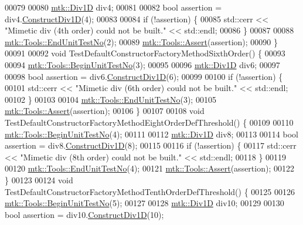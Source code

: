 \begin{DoxyCode}
00079 
00080   \hyperlink{classmtk_1_1Div1D}{mtk::Div1D} div4;
00081 
00082   \textcolor{keywordtype}{bool} assertion = div4.\hyperlink{classmtk_1_1Div1D_a52fcd1542f11e606e36bd188e48bfdf7}{ConstructDiv1D}(4);
00083 
00084   \textcolor{keywordflow}{if} (!assertion) \{
00085     std::cerr << \textcolor{stringliteral}{"Mimetic div (4th order) could not be built."} << std::endl;
00086   \}
00087 
00088   \hyperlink{classmtk_1_1Tools_aba67d9dc35c9c1c49430fcc9ea035e03}{mtk::Tools::EndUnitTestNo}(2);
00089   \hyperlink{classmtk_1_1Tools_ac6804df469c94ab6a796fb64f1e44a89}{mtk::Tools::Assert}(assertion);
00090 \}
00091 
00092 \textcolor{keywordtype}{void} TestDefaultConstructorFactoryMethodSixthOrder() \{
00093 
00094   \hyperlink{classmtk_1_1Tools_afc29ecaf337a13ed2e817d3890a5a441}{mtk::Tools::BeginUnitTestNo}(3);
00095 
00096   \hyperlink{classmtk_1_1Div1D}{mtk::Div1D} div6;
00097 
00098   \textcolor{keywordtype}{bool} assertion = div6.\hyperlink{classmtk_1_1Div1D_a52fcd1542f11e606e36bd188e48bfdf7}{ConstructDiv1D}(6);
00099 
00100   \textcolor{keywordflow}{if} (!assertion) \{
00101     std::cerr << \textcolor{stringliteral}{"Mimetic div (6th order) could not be built."} << std::endl;
00102   \}
00103 
00104   \hyperlink{classmtk_1_1Tools_aba67d9dc35c9c1c49430fcc9ea035e03}{mtk::Tools::EndUnitTestNo}(3);
00105   \hyperlink{classmtk_1_1Tools_ac6804df469c94ab6a796fb64f1e44a89}{mtk::Tools::Assert}(assertion);
00106 \}
00107 
00108 \textcolor{keywordtype}{void} TestDefaultConstructorFactoryMethodEightOrderDefThreshold() \{
00109 
00110   \hyperlink{classmtk_1_1Tools_afc29ecaf337a13ed2e817d3890a5a441}{mtk::Tools::BeginUnitTestNo}(4);
00111 
00112   \hyperlink{classmtk_1_1Div1D}{mtk::Div1D} div8;
00113 
00114   \textcolor{keywordtype}{bool} assertion = div8.\hyperlink{classmtk_1_1Div1D_a52fcd1542f11e606e36bd188e48bfdf7}{ConstructDiv1D}(8);
00115 
00116   \textcolor{keywordflow}{if} (!assertion) \{
00117     std::cerr << \textcolor{stringliteral}{"Mimetic div (8th order) could not be built."} << std::endl;
00118   \}
00119 
00120   \hyperlink{classmtk_1_1Tools_aba67d9dc35c9c1c49430fcc9ea035e03}{mtk::Tools::EndUnitTestNo}(4);
00121   \hyperlink{classmtk_1_1Tools_ac6804df469c94ab6a796fb64f1e44a89}{mtk::Tools::Assert}(assertion);
00122 \}
00123 
00124 \textcolor{keywordtype}{void} TestDefaultConstructorFactoryMethodTenthOrderDefThreshold() \{
00125 
00126   \hyperlink{classmtk_1_1Tools_afc29ecaf337a13ed2e817d3890a5a441}{mtk::Tools::BeginUnitTestNo}(5);
00127 
00128   \hyperlink{classmtk_1_1Div1D}{mtk::Div1D} div10;
00129 
00130   \textcolor{keywordtype}{bool} assertion = div10.\hyperlink{classmtk_1_1Div1D_a52fcd1542f11e606e36bd188e48bfdf7}{ConstructDiv1D}(10);

\end{DoxyCode}
